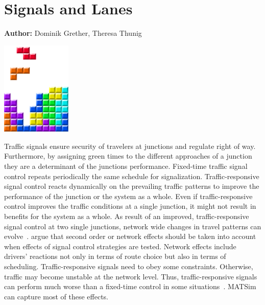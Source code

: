 \chapter{Signals and Lanes }
\label{ch:signalslanes}

\hfill \textbf{Author:} Dominik Grether, Theresa Thunig

\begin{center} \includegraphics[width=0.25\textwidth, angle=0]{figures/MATSimBook.png} \end{center}



Traffic signals ensure security of travelers at junctions and regulate right of way. 
Furthermore, by assigning green times to the different approaches of a junction they are a determinant of the junctions performance. 
Fixed-time traffic signal control repeats periodically the same schedule for signalization. 
Traffic-responsive signal control reacts dynamically on the prevailing traffic patterns to improve the performance of the junction or the system as a whole.   
Even if traffic-responsive control improves the traffic conditions at a single junction, it might not result in benefits for the system as a whole. 
As result of an improved, traffic-responsive signal control at two single junctions, network wide changes in travel patterns can evolve~\cite{Burghout2007HybridSimulationAdaptiveSignal}. 
\citet{Hu1997D2DFlowEvolutionReactiveSignalsDynasmart} argue that
second order or network effects should be taken into account when effects of signal control strategies are tested. Network effects include drivers' reactions not only in terms of route choice but also in terms of scheduling. 
Traffic-responsive signals need to obey some constraints. 
Otherwise, traffic may become unstable at the network level. 
Thus, traffic-responsive signals can perform much worse than a fixed-time control in some situations~\citep{LaemmerHelbing2010SelfStabilizingSignalControlRealNet}. 
MATSim can capture most of these effects. 

